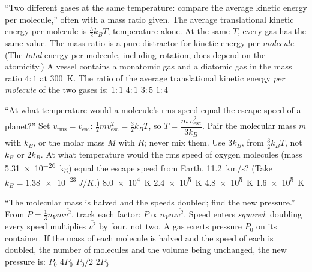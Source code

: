 {``Two different gases at the same temperature: compare the average kinetic energy per molecule,'' often
with a mass ratio given.}
{The average translational kinetic energy per molecule is $\tfrac32 k_BT$, temperature alone. At the same
$T$, every gas has the same value.}
{The mass ratio is a pure distractor for kinetic energy per \emph{molecule}. (The \emph{total} energy per
molecule, including rotation, does depend on the atomicity.)}
{A vessel contains a monatomic gas and a diatomic gas in the mass ratio $4:1$ at \SI{300}{K}. The ratio of
the average translational kinetic energy \emph{per molecule} of the two gases is:}
{$1:1$}
{$4:1$}
{$3:5$}
{$1:4$}

{``At what temperature would a molecule's rms speed equal the escape speed of a planet?''}
{Set $v_{\text{rms}}=v_{\text{esc}}$: $\tfrac12mv_{\text{esc}}^2=\tfrac32k_BT$, so
$T=\dfrac{m\,v_{\text{esc}}^2}{3k_B}$.}
{Pair the molecular mass $m$ with $k_B$, or the molar mass $M$ with $R$; never mix them. Use $3k_B$, from
$\tfrac32k_BT$, not $k_B$ or $2k_B$.}
{At what temperature would the rms speed of oxygen molecules (mass \SI{5.31e-26}{kg}) equal the escape
speed from Earth, \SI{11.2}{km/s}? (Take $k_B=\SI{1.38e-23}{J/K}$.)}
{\SI{8.0e4}{K}}
{\SI{2.4e5}{K}}
{\SI{4.8e5}{K}}
{\SI{1.6e5}{K}}

{``The molecular mass is halved and the speeds doubled; find the new pressure.''}
{From $P=\tfrac13n_Vm\overline{v^2}$, track each factor: $P\propto n_Vm\overline{v^2}$.}
{Speed enters \emph{squared}: doubling every speed multiplies $\overline{v^2}$ by four, not two.}
{A gas exerts pressure $P_0$ on its container. If the mass of each molecule is halved and the speed of each
is doubled, the number of molecules and the volume being unchanged, the new pressure is:}
{$P_0$}
{$4P_0$}
{$P_0/2$}
{$2P_0$}

